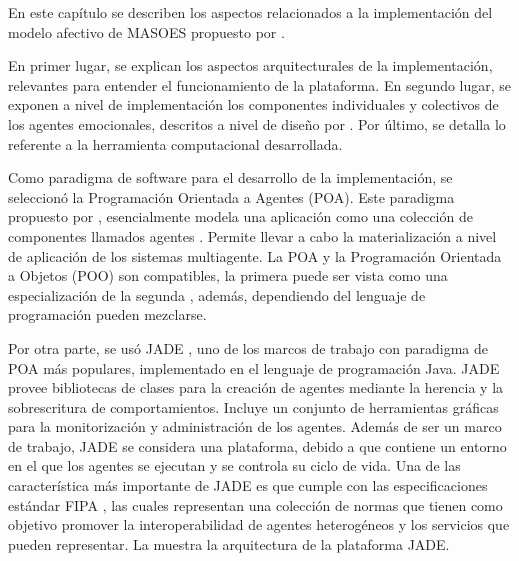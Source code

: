 %
%
%


En este capítulo se describen los aspectos relacionados a la implementación
del modelo afectivo de MASOES propuesto por \cite{perozo2011}.

En primer lugar, se explican los aspectos arquitecturales de la implementación,
relevantes para entender el funcionamiento de la plataforma.
En segundo lugar, se exponen a nivel de implementación los componentes individuales y
colectivos de los agentes emocionales, descritos a nivel de diseño por \cite{perozo2011}.
Por último, se detalla lo referente a la herramienta computacional desarrollada.


Como paradigma de software para el desarrollo de la implementación,
se seleccionó la Programación Orientada a Agentes (POA). Este paradigma propuesto
por \cite{shoham1993agent}, esencialmente modela una aplicación como una
colección de componentes llamados agentes \citep{bellifemine2007developing}.
Permite llevar a cabo la materialización a nivel de aplicación de los sistemas
multiagente.
La POA y la Programación Orientada a Objetos (POO) son
compatibles, la primera puede ser vista como una especialización de la segunda \citep{shoham1993agent},
además, dependiendo del lenguaje de programación pueden mezclarse.

Por otra parte, se usó JADE , uno de los marcos de trabajo con paradigma de POA
más populares, implementado en el lenguaje de programación Java.
JADE provee bibliotecas de clases para la creación de agentes mediante
la herencia y la sobrescritura de comportamientos. Incluye
un conjunto de herramientas gráficas para la monitorización y administración de los agentes.
Además de ser un marco de trabajo, JADE se considera una plataforma,
debido a que contiene un entorno en el que los agentes se ejecutan
y se controla su ciclo de vida. Una de las característica más importante de JADE
es que cumple con las especificaciones estándar FIPA ,
las cuales representan una colección de normas que tienen como objetivo promover la interoperabilidad
de agentes heterogéneos y los servicios que pueden representar. La 
muestra la arquitectura de la plataforma JADE.

